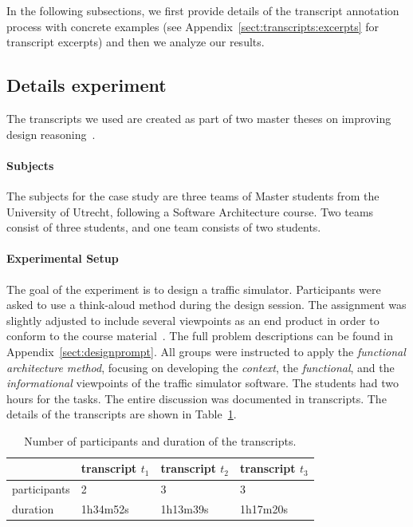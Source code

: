 In the following subsections, we first provide details of the transcript annotation process with concrete examples (see Appendix~\ref{sect:transcripts:excerpts} for transcript excerpts) and then we analyze our results.

\subsection{Details experiment}

The transcripts we used are created as part of two master theses on improving design reasoning~\cite{masterthesis1,masterthesis2}.

\paragraph{Subjects} The subjects for the case study are three teams of Master students from the University of Utrecht, following a Software Architecture course. Two teams consist of three students, and one team consists of two students.

\paragraph{Experimental Setup} The goal of the experiment is to design a traffic simulator. Participants were asked to use a think-aloud method during the design session. The assignment was slightly adjusted to include several viewpoints as an end product in order to conform to the course material~\cite{Bass:2012:SAP:2392670}. The full problem descriptions can be found in Appendix~\ref{sect:designprompt}. All groups were instructed to apply the \emph{functional architecture method}, focusing on developing the \emph{context}, the \emph{functional}, and the \emph{informational} viewpoints of the traffic simulator software. The students had two hours for the tasks. The entire discussion was documented in transcripts. The details of the transcripts are shown in Table~\ref{table:transcripts:info}.

\begin{table}[ht]
\centering
\begin{tabular}{|l|l|l|l|}
\hline
& transcript $t_1$ & transcript $t_2$ & transcript $t_3$\\
\hline
participants & 2 & 3 & 3\\
\hline
duration & 1h34m52s & 1h13m39s & 1h17m20s\\
\hline
\end{tabular}
\caption{Number of participants and duration of the transcripts.}
\label{table:transcripts:info}
\end{table}

